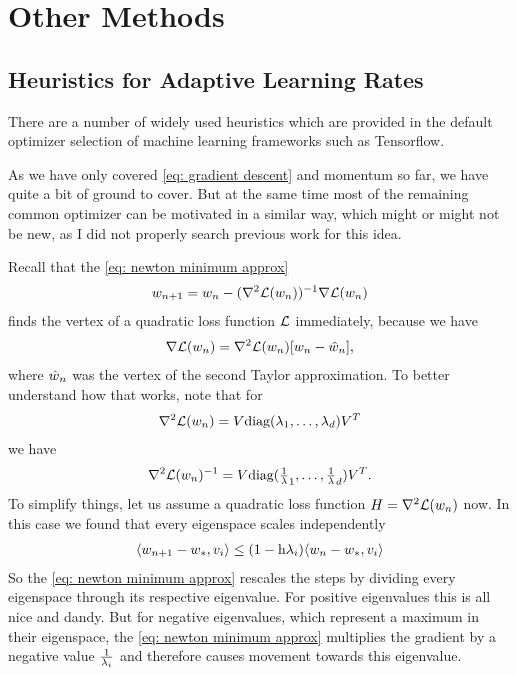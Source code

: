 \chapter{Other Methods}


\section{Heuristics for Adaptive Learning Rates}

There are a number of widely used heuristics which are provided in the
default optimizer selection of machine learning frameworks such as Tensorflow.

As we have only covered \ref{eq: gradient descent} and momentum so far, we have
quite a bit of ground to cover. But at the same time most of the remaining
common optimizer \parencite[as reviewed by e.g.][]{ruderOverviewGradientDescent2017}
can be motivated in a similar way, which might or might not be new, as I did not
properly search previous work for this idea.

Recall that the \ref{eq: newton minimum approx}
\begin{align*}
	w_{n+1}	= w_n - (\nabla^2\mathcal{L}(w_n))^{-1}\nabla\mathcal{L}(w_n)
\end{align*}
finds the vertex of a quadratic loss function \(\mathcal{L}\) immediately, because we
have
\begin{align*}
	\nabla\mathcal{L}(w_n) = \nabla^2\mathcal{L}(w_n)[w_n - \hat{w}_n],
\end{align*}
where \(\hat{w}_n\) was the vertex of the second Taylor approximation.
To better understand how that works, note that for
\begin{align*}
	\nabla^2\mathcal{L}(w_n) = V \text{diag}(\lambda_1,\dots,\lambda_d)V^T
\end{align*}
we have
\begin{align*}
	\nabla^2\mathcal{L}(w_n)^{-1}
	= V \text{diag}(\tfrac1{\lambda}_1,\dots,\tfrac1{\lambda}_d)V^T.
\end{align*}
To simplify things, let us assume a quadratic loss function
\(H=\nabla^2\mathcal{L}(w_n)\) now.  In this case we found that every
eigenspace scales independently
\begin{align*}
	\langle w_{n+1} - w_*, v_i \rangle
	\le (1-\text{h} \lambda_i)\langle w_n - w_*, v_i \rangle
\end{align*}
So the \ref{eq: newton minimum approx} rescales the steps by dividing every
eigenspace through its respective eigenvalue. For positive eigenvalues this is
all nice and dandy. But for negative eigenvalues, which represent a maximum in
their eigenspace, the \ref{eq: newton minimum approx} multiplies the gradient by
a negative value \(\tfrac1{\lambda_i}\) and therefore causes movement towards
this eigenvalue.

